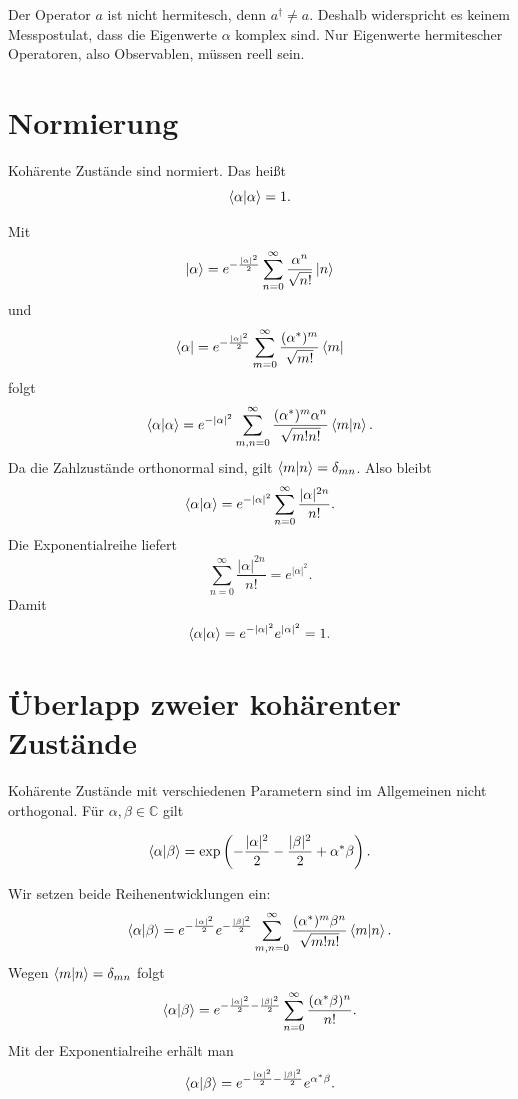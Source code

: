 \begin{notebox}
Der Operator \(a\) ist nicht hermitesch, denn \(a^\dagger\neq a\). Deshalb widerspricht es keinem Messpostulat, dass die Eigenwerte \(\alpha\) komplex sind. Nur Eigenwerte hermitescher Operatoren, also Observablen, müssen reell sein.
\end{notebox}

\section{Normierung}

Kohärente Zustände sind normiert. Das heißt
\[
    \left\langle\alpha\middle|\alpha\right\rangle=1.
\]

\begin{derivationbox}
Mit
\[
    \left|\alpha\right\rangle=e^{-\frac{|\alpha|^2}{2}}
    \sum_{n=0}^{\infty}\frac{\alpha^n}{\sqrt{n!}}\left|n\right\rangle
\]
und
\[
    \left\langle\alpha\right|=e^{-\frac{|\alpha|^2}{2}}
    \sum_{m=0}^{\infty}\frac{(\alpha^*)^m}{\sqrt{m!}}\left\langle m\right|
\]
folgt
\[
    \left\langle\alpha\middle|\alpha\right\rangle
    =e^{-|\alpha|^2}
    \sum_{m,n=0}^{\infty}
    \frac{(\alpha^*)^m\alpha^n}{\sqrt{m!n!}}\left\langle m\middle|n\right\rangle.
\]
Da die Zahlzustände orthonormal sind, gilt \(\left\langle m\middle|n\right\rangle=\delta_{mn}\). Also bleibt
\[
    \left\langle\alpha\middle|\alpha\right\rangle
    =e^{-|\alpha|^2}
    \sum_{n=0}^{\infty}\frac{|\alpha|^{2n}}{n!}.
\]
Die Exponentialreihe liefert
\[
    \sum_{n=0}^{\infty}\frac{|\alpha|^{2n}}{n!}=e^{|\alpha|^2}.
\]
Damit
\[
    \left\langle\alpha\middle|\alpha\right\rangle=e^{-|\alpha|^2}e^{|\alpha|^2}=1.
\]
\end{derivationbox}

\section{Überlapp zweier kohärenter Zustände}

Kohärente Zustände mit verschiedenen Parametern sind im Allgemeinen nicht orthogonal. Für \(\alpha,\beta\in\mathbb{C}\) gilt
\begin{formulabox}
\[
    \left\langle\alpha\middle|\beta\right\rangle
    =\exp\left(-\frac{|\alpha|^2}{2}-\frac{|\beta|^2}{2}+\alpha^*\beta\right).
\]
\end{formulabox}

\begin{derivationbox}
Wir setzen beide Reihenentwicklungen ein:
\[
    \left\langle\alpha\middle|\beta\right\rangle
    =e^{-\frac{|\alpha|^2}{2}}e^{-\frac{|\beta|^2}{2}}
    \sum_{m,n=0}^{\infty}
    \frac{(\alpha^*)^m\beta^n}{\sqrt{m!n!}}\left\langle m\middle|n\right\rangle.
\]
Wegen \(\left\langle m\middle|n\right\rangle=\delta_{mn}\) folgt
\[
    \left\langle\alpha\middle|\beta\right\rangle
    =e^{-\frac{|\alpha|^2}{2}-\frac{|\beta|^2}{2}}
    \sum_{n=0}^{\infty}\frac{(\alpha^*\beta)^n}{n!}.
\]
Mit der Exponentialreihe erhält man
\[
    \left\langle\alpha\middle|\beta\right\rangle
    =e^{-\frac{|\alpha|^2}{2}-\frac{|\beta|^2}{2}}e^{\alpha^*\beta}.
\]
\end{derivationbox}

